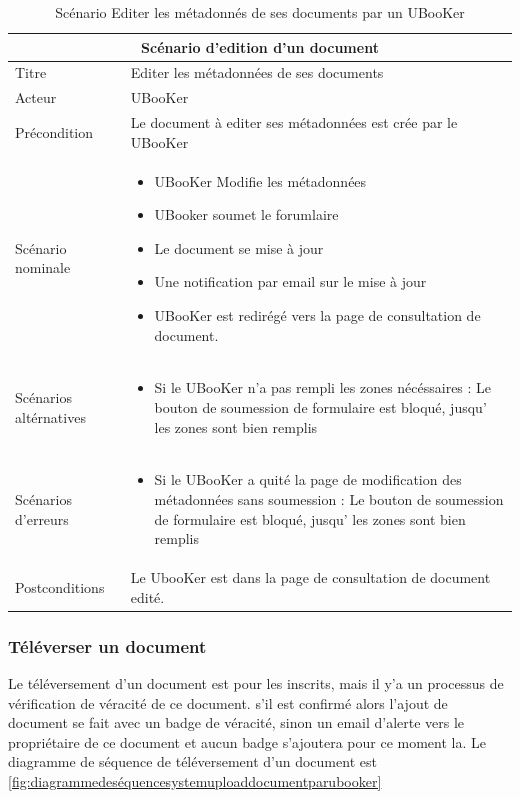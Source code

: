 \documentclass[12pt]{report}
\begin{document}
\begin{table}[h!]
\begin{center}
\begin{tabular}{ |p{4cm}|p{11cm}|  }
 \hline
 \multicolumn{2}{|c|}{Scénario d'edition d'un document} \\
 \hline
 Titre & Editer les métadonnées de ses documents\\
 \hline
 Acteur& UBooKer \\
 \hline
 Précondition   & Le document à editer ses métadonnées est crée par le UBooKer   \\
 \hline 
 Scénario nominale &   \begin{itemize}
 \item UBooKer Modifie les métadonnées
 \item UBooker soumet le forumlaire
 \item Le document se mise à jour
 \item Une notification par email sur le mise à jour
 \item UBooKer est redirégé vers la page de consultation de document.
\end{itemize}   \\
 \hline
 Scénarios altérnatives & \begin{itemize}
 \item Si le UBooKer n'a pas rempli les zones nécéssaires :
 Le bouton de soumession de formulaire est bloqué, jusqu' les zones sont bien remplis
\end{itemize}   \\
 \hline
 Scénarios d'erreurs &  \begin{itemize}
 \item Si le UBooKer a quité la page de modification des métadonnées sans soumession : 
 Le bouton de soumession de formulaire est bloqué, jusqu' les zones sont bien remplis
\end{itemize}   \\
 \hline
 Postconditions & Le UbooKer est dans la page de consultation de document edité. \\
 \hline
\end{tabular}
\caption{Scénario Editer les métadonnés de ses documents par un UBooKer}
\label{table:scenarioediterlesmetadonnéesdessesdocumentparunUBooKer}
\end{center}
\end{table}

\subsubsection{Téléverser un document}
Le téléversement d'un document est pour les inscrits, mais il y'a un processus de vérification de véracité de ce document. s'il est confirmé alors l'ajout de document se fait avec un badge de véracité, sinon un email d'alerte vers le propriétaire de ce document et aucun badge s'ajoutera pour ce moment la. Le diagramme de séquence de téléversement d'un document est \ref{fig:diagrammedeséquencesystemuploaddocumentparubooker}
\end{document}
